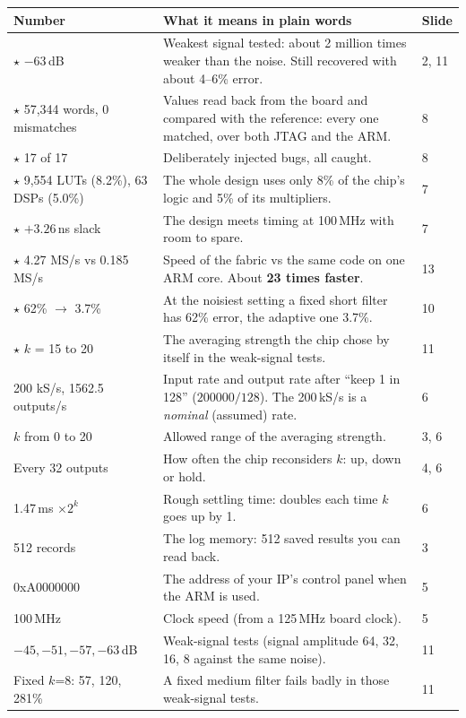 \documentclass[11pt,a4paper]{article}
\begin{document}
\begin{longtable}{@{}p{4.3cm}p{9.9cm}p{1.4cm}@{}}
\toprule \textbf{Number} & \textbf{What it means in plain words} & \textbf{Slide}\\ \midrule\endhead
$\star$ $-63$\,dB & Weakest signal tested: about 2 million times weaker than the noise. Still recovered with about 4--6\% error. & 2, 11\\
$\star$ 57,344 words, 0 mismatches & Values read back from the board and compared with the reference: every one matched, over both JTAG and the ARM. & 8\\
$\star$ 17 of 17 & Deliberately injected bugs, all caught. & 8\\
$\star$ 9,554 LUTs (8.2\%), 63 DSPs (5.0\%) & The whole design uses only 8\% of the chip's logic and 5\% of its multipliers. & 7\\
$\star$ $+3.26$\,ns slack & The design meets timing at 100\,MHz with room to spare. & 7\\
$\star$ 4.27 MS/s vs 0.185 MS/s & Speed of the fabric vs the same code on one ARM core. About \textbf{23 times faster}. & 13\\
$\star$ 62\% $\to$ 3.7\% & At the noisiest setting a fixed short filter has 62\% error, the adaptive one 3.7\%. & 10\\
$\star$ $k$ = 15 to 20 & The averaging strength the chip chose by itself in the weak-signal tests. & 11\\
\midrule
200 kS/s, 1562.5 outputs/s & Input rate and output rate after ``keep 1 in 128'' ($200000/128$). The 200\,kS/s is a \emph{nominal} (assumed) rate. & 6\\
$k$ from 0 to 20 & Allowed range of the averaging strength. & 3, 6\\
Every 32 outputs & How often the chip reconsiders $k$: up, down or hold. & 4, 6\\
1.47\,ms $\times 2^k$ & Rough settling time: doubles each time $k$ goes up by 1. & 6\\
512 records & The log memory: 512 saved results you can read back. & 3\\
0xA0000000 & The address of your IP's control panel when the ARM is used. & 5\\
100\,MHz & Clock speed (from a 125\,MHz board clock). & 5\\
$-45,-51,-57,-63$\,dB & Weak-signal tests (signal amplitude 64, 32, 16, 8 against the same noise). & 11\\
Fixed $k$=8: 57, 120, 281\% & A fixed medium filter fails badly in those weak-signal tests. & 11\\

\end{longtable}
\end{document}
